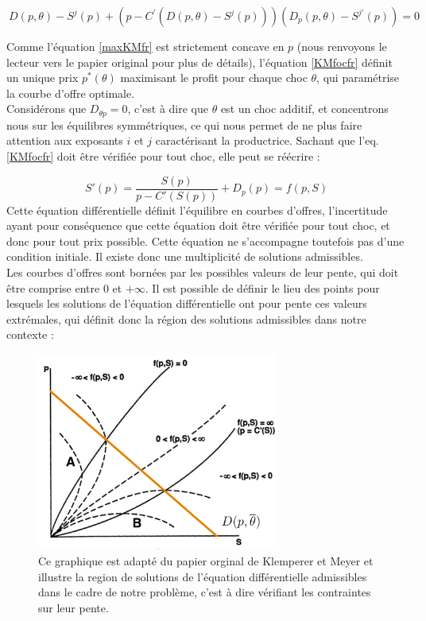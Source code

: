 \begin{equation}\label{KMfocfr}
\ D(p,\theta) - S^j(p) + \left( p - C^\prime\left( D(p,\theta) - S^j(p)\right)    \right)\left(  D_p(p,\theta)   - S^{j\prime}(p)\right) = 0
\end{equation}

Comme l'équation \ref{maxKMfr} est strictement concave en $p$ (nous renvoyons le lecteur vers le papier original pour plus de détails), l'équation \ref{KMfocfr} définit un unique prix $p^*(\theta)$ maximisant le profit pour chaque choc $\theta$, qui paramétrise la courbe d'offre optimale. \\

Considérons que $D_{\theta p }=0$, c'est à dire que $\theta$ est un choc additif, et concentrons nous sur les équilibres symmétriques, ce qui nous permet de ne plus faire attention aux exposants $i$ et $j$ caractérisant la productrice. Sachant que l'eq. \ref{KMfocfr} doit être vérifiée pour tout choc, elle peut se réécrire :

\begin{equation}\label{KMdifffr}
S'(p) = \frac{S(p)}{p-C'(S(p))} + D_p(p)= f(p,S)
\end{equation}
Cette équation différentielle définit l'équilibre en courbes d'offres, l'incertitude ayant pour conséquence que cette équation doit être vérifiée pour tout choc, et donc pour tout prix possible. Cette équation ne s'accompagne toutefois pas d'une condition initiale. Il existe donc une multiplicité de solutions admissibles.\\

Les courbes d'offres sont bornées par les possibles valeurs de leur pente, qui doit être comprise entre $0$ et $+\infty$. Il est possible de définir le lieu des points pour lesquels les solutions de l'équation différentielle ont pour pente ces valeurs extrémales, qui définit donc la région des solutions admissibles dans notre contexte : 

\begin{figure}[h]
\centering
\includegraphics[width=8cm]{figintro/KMboundaries.png}
\caption{\small{Ce graphique est adapté du papier orginal de Klemperer et Meyer et illustre la region de solutions de l'équation différentielle admissibles dans le cadre de notre problème, c'est à dire vérifiant les contraintes sur leur pente.}}
\label{KMboundariesfr}
\end{figure}

